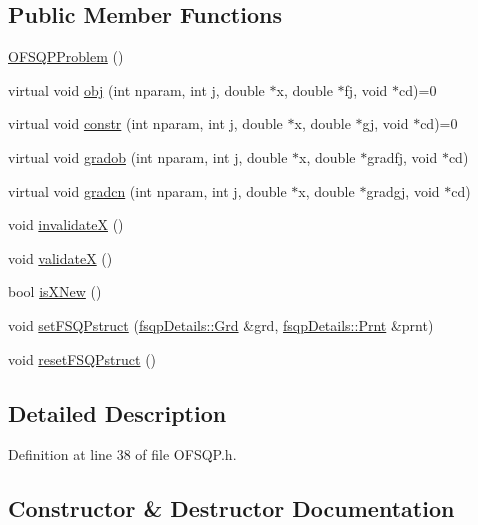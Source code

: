 \subsection*{Public Member Functions}
\begin{DoxyCompactItemize}
\item 
\hyperlink{classocra_1_1OFSQPProblem_affaeb6cbf6326ef2e9dab6b7ee8c80f6}{O\+F\+S\+Q\+P\+Problem} ()
\item 
virtual void \hyperlink{classocra_1_1OFSQPProblem_adca0c224eb1b9f6e0c2d17f07277a899}{obj} (int nparam, int j, double $\ast$x, double $\ast$fj, void $\ast$cd)=0
\item 
virtual void \hyperlink{classocra_1_1OFSQPProblem_a2049a97008ac6eaa306c3cb05ef7d394}{constr} (int nparam, int j, double $\ast$x, double $\ast$gj, void $\ast$cd)=0
\item 
virtual void \hyperlink{classocra_1_1OFSQPProblem_a1300d237d9b87df1f71db7129c38458a}{gradob} (int nparam, int j, double $\ast$x, double $\ast$gradfj, void $\ast$cd)
\item 
virtual void \hyperlink{classocra_1_1OFSQPProblem_ab89eefbaf9b86a89a0ceede0b4b61284}{gradcn} (int nparam, int j, double $\ast$x, double $\ast$gradgj, void $\ast$cd)
\item 
void \hyperlink{classocra_1_1OFSQPProblem_a65096824ee00c0254cfeee877dba0141}{invalidateX} ()
\item 
void \hyperlink{classocra_1_1OFSQPProblem_a4877a5ab95e85c32c32eca22d2db1147}{validateX} ()
\item 
bool \hyperlink{classocra_1_1OFSQPProblem_a3c43fbd5d2ef3aeb9c6d936c83d34464}{is\+X\+New} ()
\item 
void \hyperlink{classocra_1_1OFSQPProblem_ae57b5fa2934e2ae619e748079335d3b7}{set\+F\+S\+Q\+Pstruct} (\hyperlink{structocra_1_1fsqpDetails_1_1Grd}{fsqp\+Details\+::\+Grd} \&grd, \hyperlink{structocra_1_1fsqpDetails_1_1Prnt}{fsqp\+Details\+::\+Prnt} \&prnt)
\item 
void \hyperlink{classocra_1_1OFSQPProblem_a774f1a1e9d5014ea878b8de4750c3a13}{reset\+F\+S\+Q\+Pstruct} ()
\end{DoxyCompactItemize}


\subsection{Detailed Description}


Definition at line 38 of file O\+F\+S\+Q\+P.\+h.



\subsection{Constructor \& Destructor Documentation}
